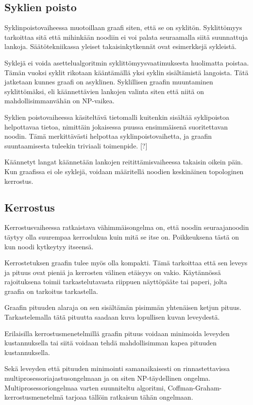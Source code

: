\documentclass[finnish,12pt]{article}
\begin{document}
		\subsection{Syklien poisto}

Syklinpoistovaiheessa muotoillaan graafi siten, että se on syklitön.
Syklittömyys tarkoittaa sitä että mihinkään noodiin ei voi palata seuraamalla siitä suunnattuja lankoja.
Säätötekniikassa yleiset takaisinkytkennät ovat esimerkkejä sykleistä.

Syklejä ei voida asettelualgoritmin syklittömyysvaatimuksesta huolimatta poistaa.
Tämän vuoksi syklit rikotaan kääntämällä yksi syklin sisältämistä langoista.
Tätä jatketaan kunnes graafi on asyklinen.
Syklillisen graafin muuntaminen syklittömäksi, eli käännettävien lankojen valinta siten että niitä on mahdollisimmanvähän on NP-vaikea.

Syklien poistovaiheessa käsiteltävä tietomalli kuitenkin sisältää syklipoistoa helpottavaa tietoa, nimittäin jokaisessa puussa ensimmäisenä suoritettavan noodin. Tämä merkittävästi helpottaa syklinpoistovaihetta, ja graafin suuntaamisesta tuleekin triviaali toimenpide. [?]

Käännetyt langat käännetään lankojen reitittämisvaiheessa takaisin oikein päin.
Kun graafissa ei ole syklejä, voidaan määritellä noodien keskinäinen topologinen kerrostus.

		\subsection{Kerrostus}

Kerrostusvaiheessa ratkaistava vähimmäisongelma on, että noodin seuraajanoodin täytyy olla suurempaa kerroslukua kuin mitä se itse on. Poikkeuksena tästä on kun noodi kytkeytyy itseensä.

Kerrostetuksen graafin tulee myös olla kompakti. Tämä tarkoittaa että sen leveys ja pituus ovat pieniä ja kerrosten välinen etäisyys on vakio. 
Käytännössä rajoituksena toimii tarkastelutavasta riippuen näyttöpääte tai paperi, jolta graafia on tarkoitus tarkastella.

Graafin pituuden alaraja on sen sisältämän pisimmän yhtenäisen ketjun pituus. Tarkastelemalla tätä pituutta saadaan kuva lopullisen kuvan leveydestä.

Erilaisilla kerrostusmenetelmillä graafin pituus voidaan minimoida leveyden kustannuksella tai siitä voidaan tehdä mahdollisimman kapea pituuden kustannuksella.

Sekä leveyden että pituuden minimointi samanaikaisesti on rinnastettavissa multiprosessoriajastusongelmaan ja on siten NP-täydellinen ongelma. \cite{RefWorks:39}
Multiprosessoriongelmaa varten suunniteltu algoritmi, Coffman-Graham-kerrostusmenetelmä tarjoaa tällöin ratkaisun tähän ongelmaan.
\end{document}
